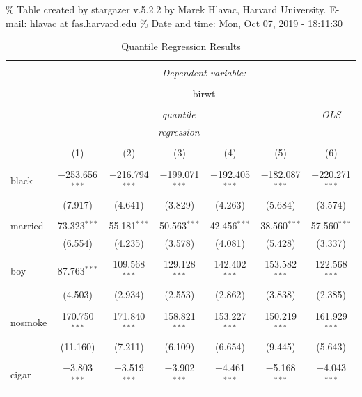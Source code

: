 \documentclass[]{book}
\begin{document}
\% Table created by stargazer v.5.2.2 by Marek Hlavac, Harvard
University. E-mail: hlavac at fas.harvard.edu \% Date and time: Mon, Oct
07, 2019 - 18:11:30

\begin{table}[!htbp] \centering 
  \caption{Quantile Regression Results} 
  \label{tab:} 
\begin{tabular}{@{\extracolsep{5pt}}lcccccc} 
\\[-1.8ex]\hline 
\hline \\[-1.8ex] 
 & \multicolumn{6}{c}{\textit{Dependent variable:}} \\ 
\cline{2-7} 
\\[-1.8ex] & \multicolumn{6}{c}{birwt} \\ 
\\[-1.8ex] & \multicolumn{5}{c}{\textit{quantile}} & \textit{OLS} \\ 
 & \multicolumn{5}{c}{\textit{regression}} & \textit{} \\ 
\\[-1.8ex] & (1) & (2) & (3) & (4) & (5) & (6)\\ 
\hline \\[-1.8ex] 
 black & $-$253.656$^{***}$ & $-$216.794$^{***}$ & $-$199.071$^{***}$ & $-$192.405$^{***}$ & $-$182.087$^{***}$ & $-$220.271$^{***}$ \\ 
  & (7.917) & (4.641) & (3.829) & (4.263) & (5.684) & (3.574) \\ 
  & & & & & & \\ 
 married & 73.323$^{***}$ & 55.181$^{***}$ & 50.563$^{***}$ & 42.456$^{***}$ & 38.560$^{***}$ & 57.560$^{***}$ \\ 
  & (6.554) & (4.235) & (3.578) & (4.081) & (5.428) & (3.337) \\ 
  & & & & & & \\ 
 boy & 87.763$^{***}$ & 109.568$^{***}$ & 129.128$^{***}$ & 142.402$^{***}$ & 153.582$^{***}$ & 122.568$^{***}$ \\ 
  & (4.503) & (2.934) & (2.553) & (2.862) & (3.838) & (2.385) \\ 
  & & & & & & \\ 
 nosmoke & 170.750$^{***}$ & 171.840$^{***}$ & 158.821$^{***}$ & 153.227$^{***}$ & 150.219$^{***}$ & 161.929$^{***}$ \\ 
  & (11.160) & (7.211) & (6.109) & (6.654) & (9.445) & (5.643) \\ 
  & & & & & & \\ 
 cigar & $-$3.803$^{***}$ & $-$3.519$^{***}$ & $-$3.902$^{***}$ & $-$4.461$^{***}$ & $-$5.168$^{***}$ & $-$4.043$^{***}$ \\ 

\end{tabular}
\end{table}
\end{document}
